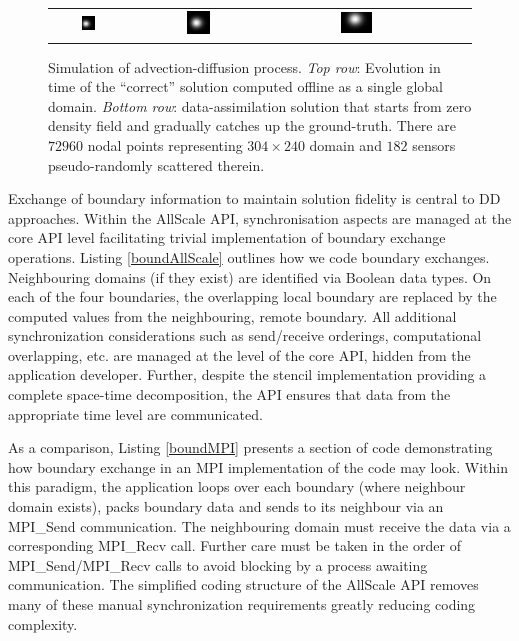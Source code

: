 \documentclass[conference,compsoc]{IEEEtran}
\begin{document}
\begin{figure}[!h]
\begin{tabular}{ccccc}
\includegraphics[width=0.19\textwidth]{images/field-t=1232} & 
\includegraphics[width=0.19\textwidth]{images/field-t=3006} &
\includegraphics[width=0.19\textwidth]{images/field-t=4089} 
\end{tabular}
\caption{Simulation of advection-diffusion process. \textit{Top row}: Evolution in time of the ``correct'' solution computed offline as a single global domain. \textit{Bottom row}: data-assimilation solution that starts from zero density field and gradually catches up the ground-truth. There are $72960$ nodal points representing $304{\times}240$ domain and $182$ sensors pseudo-randomly scattered therein.}
\label{fig:density}
\end{figure}




Exchange of boundary information to maintain solution fidelity is central to DD approaches. Within the AllScale API, synchronisation aspects are managed at the core API level facilitating trivial implementation of boundary exchange operations. Listing \ref{boundAllScale} outlines how we code boundary exchanges. Neighbouring domains (if they exist) are identified via Boolean data types. On each of the four boundaries, the overlapping local boundary are replaced by the computed values from the neighbouring, remote boundary. All additional synchronization considerations such as send/receive orderings, computational overlapping, etc. are managed at the level of the core API, hidden from the application developer. Further, despite the stencil implementation providing a complete space-time decomposition, the API ensures that data from the appropriate time level are communicated. 


As a comparison, Listing \ref{boundMPI} presents a section of code demonstrating how boundary exchange in an MPI implementation of the code may look. Within this paradigm, the application loops over each boundary (where neighbour domain exists), packs boundary data and sends to its neighbour via an MPI\_Send communication. The neighbouring domain must receive the data  via a  corresponding MPI\_Recv call. Further care must be taken in the order of MPI\_Send/MPI\_Recv calls to avoid blocking by a process awaiting communication. The simplified coding structure of the AllScale API removes many of these manual synchronization requirements greatly reducing coding complexity.
\end{document}
